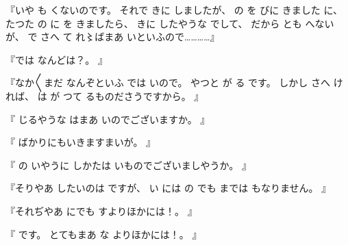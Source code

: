 『いや
も
くないのです。
それで
きに
しましたが、
の
を
びに
きました
に、たつた
の
に
を
きましたら、
きに
したやうな
でして、
だから
とも
へないが、
で
さへ
て
れ〻ばまあ
いといふので…………』

『では
なんどは？。
』

『なか〳〵まだ
なんぞといふ
では
いので。
やつと
が
る
です。
しかし
さへ
ければ、
は
が
つて
るものださうですから。
』

『
じるやうな
はまあ
いのでございますか。
』

『
ばかりにもいきますまいが。
』

『
の
いやうに
しかたは
いものでございましやうか。
』

『そりやあ
したいのは
ですが、
い
には
の
でも
までは
もなりません。
』

『それぢやあ
にでも
すよりほかには！。
』

『
です。
とてもまあ
な
よりほかには！。
』

